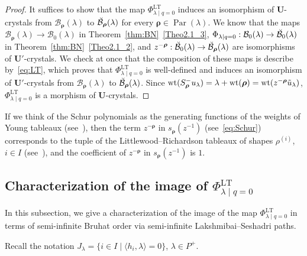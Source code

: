 \documentclass[ALCO,ThmDefs,Unicode,epreuves]{cedram}
\newcommand\bmrho[1]{\boldsymbol{#1}}
\renewcommand{\U}{\mathbf{U}}
\DeclareMathOperator{\wt}{wt}
\DeclareMathOperator{\LT}{LT}
\DeclareMathOperator{\Par}{Par}
\begin{document}
\begin{proof}
It suffices to show that the map
$\Phi_{\lambda \mid q=0}^{\LT }$ 
induces an isomorphism of $\U$-crystals from
$\mathcal{B}_{\bmrho{\rho}}(\lambda)$
to
$\Breve{\mathcal{B}}_{\bmrho{\rho}}(\lambda)$
for every 
$\bmrho{\rho} \in \Par (\lambda)$.
We know that the maps
$\mathcal{B}_{\bmrho{\rho}}(\lambda) \rightarrow \mathcal{B}_0(\lambda)$ 
in Theorem~\ref{thm:BN}~\ref{Theo2.1_3}, 
$\Phi_{\lambda \mid q=0} : 
\mathcal{B}_0(\lambda)
\rightarrow 
\Breve{\mathcal{B}}_0(\lambda)$
in Theorem~\ref{thm:BN}~\ref{Theo2.1_2}, and 
$z^{-\bmrho{\rho}} : 
\Breve{\mathcal{B}}_0(\lambda)
\rightarrow 
\Breve{\mathcal{B}}_{\bmrho{\rho}}(\lambda)$
are isomorphisms of $\U'$-crystals. 
We check at once that the composition of these maps is describe by~\eqref{eq:LT}, 
which proves that 
$\Phi_{\lambda \mid q=0}^{\LT }$ 
is well-defined and induces an isomorphism of $\U'$-crystals from 
$\mathcal{B}_{\bmrho{\rho}}(\lambda)$
to
$\Breve{\mathcal{B}}_{\bmrho{\rho}}(\lambda)$. 
Since 
$\wt (S_{\bmrho{\rho}}^- u_{\lambda}) 
= 
\lambda + \wt (\bmrho{\rho})
=
\wt (z^{-\bmrho{\rho}} \Tilde{u}_{\lambda})$, 
$\Phi_{\lambda \mid q=0}^{\LT }$ 
is a morphism of $\U$-crystals. 
\end{proof}

\begin{rema} \label{rem:LT}
If we think of the Schur polynomials
as the generating functions of the 
weights of Young tableaux (see~\cite[Page~3]{F}), 
then the term
$z^{-\bmrho{\rho}}$
in 
$s_{\bmrho{\rho}}(z^{-1})$ 
(see~\eqref{eq:Schur})
corresponds to the tuple 
of the Littlewood--Richardson tableaux 
of shapes $\rho^{(i)}$, $i \in I$
(see~\cite[\S~5.2]{F}), 
and the coefficient of 
$z^{-\bmrho{\rho}}$
in 
$s_{\bmrho{\rho}}(z^{-1})$
is $1$. 
\end{rema}

\subsection{Characterization of the image of \texorpdfstring{$\Phi_{\lambda \mid q=0}^{\LT }$}{Phi lambda|q=0 LT}}

In this subsection, we give a characterization of the image of the map 
$\Phi_{\lambda \mid q=0}^{\LT }$
in terms of semi-infinite Bruhat order 
via semi-infinite Lakshmibai--Seshadri paths. 

Recall the notation 
$J_{\lambda} = \{ i \in I \mid \langle h_i , \lambda \rangle = 0 \}$, 
$\lambda \in P^+$. 
\end{document}
